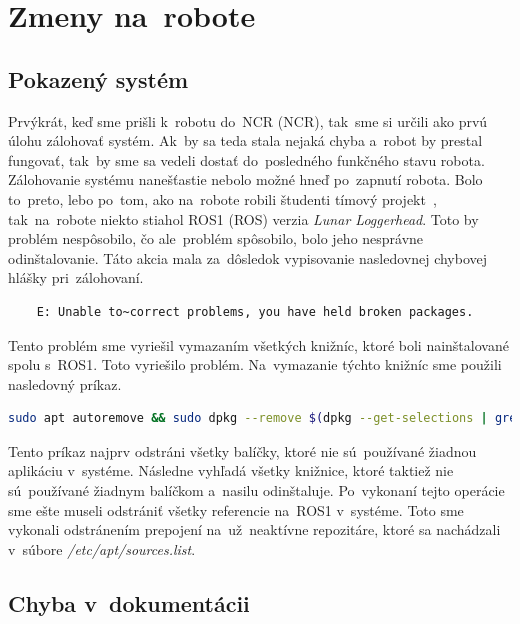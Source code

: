 \section{Zmeny na~robote}

\subsection{Pokazený systém}
\label{subsec:brokenSystem}

Prvýkrát, keď sme prišli k~robotu do~NCR (\acrlong{NCR}), tak~sme si určili ako prvú úlohu zálohovať systém. Ak~by sa teda stala nejaká chyba
a~robot by prestal fungovať, tak~by sme sa vedeli dostať do~posledného funkčného stavu robota. Zálohovanie systému nanešťastie nebolo možné
hneď po~zapnutí robota. Bolo to~preto, lebo po~tom, ako na~robote robili študenti tímový projekt~\cite{timovyProjekt}, tak~na~robote niekto
stiahol ROS1 (\acrlong{ROS}) verzia \textit{Lunar Loggerhead}. Toto by problém nespôsobilo, čo ale~problém spôsobilo, bolo jeho nesprávne odinštalovanie.
Táto akcia mala za~dôsledok vypisovanie nasledovnej chybovej hlášky pri~zálohovaní.

\begin{lstlisting}
	E: Unable to~correct problems, you have held broken packages.
\end{lstlisting}

Tento problém sme vyriešil vymazaním všetkých knižníc, ktoré boli nainštalované spolu s~ROS1. Toto vyriešilo problém. Na~vymazanie týchto
knižníc sme použili nasledovný príkaz.

\begin{lstlisting}[language=bash]
	sudo apt autoremove && sudo dpkg --remove $(dpkg --get-selections | grep hold)
\end{lstlisting}

Tento príkaz najprv odstráni všetky balíčky, ktoré nie sú~používané žiadnou aplikáciu v~systéme. Následne vyhľadá všetky knižnice,
ktoré taktiež nie sú~používané žiadnym balíčkom a~nasilu odinštaluje. Po~vykonaní tejto operácie sme ešte museli odstrániť všetky referencie
na~ROS1 v~systéme. Toto sme vykonali odstránením prepojení na~už~neaktívne repozitáre, ktoré sa nachádzali v~súbore \textit{/etc/apt/sources.list}.

\subsection{Chyba v~dokumentácii}
\label{subsec:documentationIssue}

